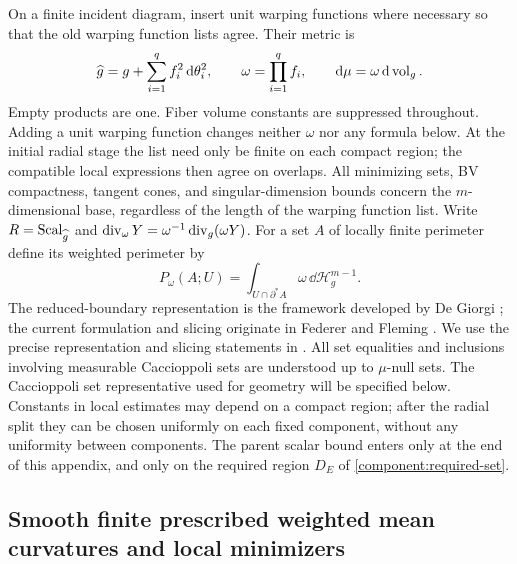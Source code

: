 On a finite incident diagram, insert unit warping functions where necessary so that
the old warping function lists agree.  Their metric is
\[
 \widehat g=g+\sum_{i=1}^q f_i^2\,\mathrm d\theta_i^2,
 \qquad \omega=\prod_{i=1}^q f_i,
 \qquad \mathrm d\mu=\omega\,\mathrm d\operatorname{vol}_g.
\]
Empty products are one.  Fiber volume constants are suppressed throughout.
Adding a unit warping function changes neither $\omega$ nor any formula below.
At the initial radial stage the list need only be finite on each compact
region; the compatible local expressions then agree on overlaps.
All minimizing sets,
BV compactness, tangent cones, and singular-dimension bounds concern the
$m$-dimensional base, regardless of the length of the warping function list.
Write $R=\operatorname{Scal}_{\widehat g}$ and
$\operatorname{div}_\omega Y=\omega^{-1}\operatorname{div}_g(\omega Y)$.
For a set $A$ of locally finite perimeter define its weighted perimeter by
\[
 P_\omega(A;U)=\int_{U\cap\partial^*A}\omega\,\dd\mathcal H_g^{m-1}.
\]
The reduced-boundary representation is the framework developed by
De Giorgi \citep{deGiorgi1954,deGiorgi1955}; the current formulation
and slicing originate in Federer and Fleming \citep{federerFleming1960}.
We use the precise representation and slicing statements in
\citet[Chapter~3, Section~4, and Chapter~6, Section~4]{simonGMT}.
All set equalities and inclusions involving measurable Caccioppoli sets are understood
up to $\mu$-null sets.  The Caccioppoli set representative used for geometry will be
specified below.  Constants in local estimates may depend on a compact
region; after the radial split they can be chosen uniformly on each fixed
component, without any uniformity between components.  The
parent scalar bound enters only at the end of this appendix, and only on
the required region $D_E$ of \cref{component:required-set}.

\subsection{Smooth finite prescribed weighted mean curvatures and local minimizers}

